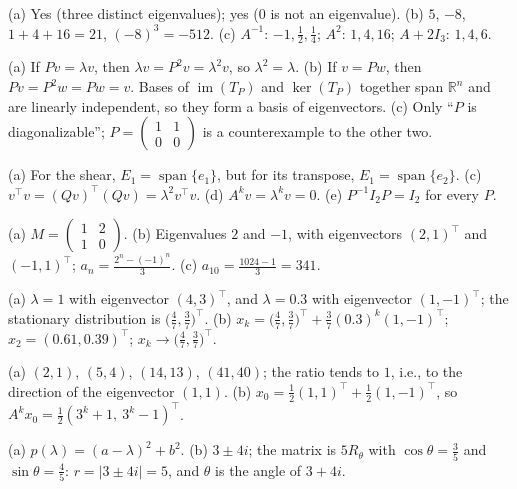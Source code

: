 \documentclass[11pt]{article}
\theoremstyle{definition}
\DeclareMathOperator{\im}{im}
\DeclareMathOperator{\Span}{span}
\begin{document}
\begin{description}[leftmargin=0pt, itemsep=0.3em]
    \item[\ref{pr:eig-gre}.] (a) Yes (three distinct eigenvalues); yes ($0$ is not an eigenvalue). (b) $5$, $-8$, $1 + 4 + 16 = 21$, $(-8)^3 = -512$. (c) $A^{-1}$: $-1, \frac{1}{2}, \frac{1}{4}$; $A^2$: $1, 4, 16$; $A + 2I_3$: $1, 4, 6$.
    \item[\ref{pr:eig-idempotent}.] (a) If $Pv = \lambda v$, then $\lambda v = P^2 v = \lambda^2 v$, so $\lambda^2 = \lambda$. (b) If $v = Pw$, then $Pv = P^2w = Pw = v$. Bases of $\im(T_P)$ and $\ker(T_P)$ together span $\mathbb{R}^n$ and are linearly independent, so they form a basis of eigenvectors. (c) Only ``$P$ is diagonalizable''; $P = \begin{pmatrix} 1 & 1 \\ 0 & 0 \end{pmatrix}$ is a counterexample to the other two.
    \item[\ref{pr:eig-props}.] (a) For the shear, $E_1 = \Span\{e_1\}$, but for its transpose, $E_1 = \Span\{e_2\}$. (c) $v^\top v = (Qv)^\top(Qv) = \lambda^2 v^\top v$. (d) $A^k v = \lambda^k v = 0$. (e) $P^{-1} I_2 P = I_2$ for every $P$.
    \item[\ref{pr:eig-recurrence}.] (a) $M = \begin{pmatrix} 1 & 2 \\ 1 & 0 \end{pmatrix}$. (b) Eigenvalues $2$ and $-1$, with eigenvectors $(2, 1)^\top$ and $(-1, 1)^\top$; $a_n = \frac{2^n - (-1)^n}{3}$. (c) $a_{10} = \frac{1024 - 1}{3} = 341$.
    \item[\ref{pr:eig-markov}.] (a) $\lambda = 1$ with eigenvector $(4, 3)^\top$, and $\lambda = 0.3$ with eigenvector $(1, -1)^\top$; the stationary distribution is $\big(\frac{4}{7}, \frac{3}{7}\big)^\top$. (b) $x_k = \big(\frac{4}{7}, \frac{3}{7}\big)^\top + \frac{3}{7}(0.3)^k (1, -1)^\top$; $x_2 = (0.61, 0.39)^\top$; $x_k \to \big(\frac{4}{7}, \frac{3}{7}\big)^\top$.
    \item[\ref{pr:eig-power}.] (a) $(2, 1)$, $(5, 4)$, $(14, 13)$, $(41, 40)$; the ratio tends to $1$, i.e., to the direction of the eigenvector $(1, 1)$. (b) $x_0 = \frac{1}{2}(1, 1)^\top + \frac{1}{2}(1, -1)^\top$, so $A^k x_0 = \frac{1}{2}(3^k + 1, \ 3^k - 1)^\top$.
    \item[\ref{pr:eig-complex}.] (a) $p(\lambda) = (a - \lambda)^2 + b^2$. (b) $3 \pm 4i$; the matrix is $5 R_\theta$ with $\cos\theta = \frac{3}{5}$ and $\sin\theta = \frac{4}{5}$: $r = |3 \pm 4i| = 5$, and $\theta$ is the angle of $3 + 4i$.
\end{description}
\end{document}

